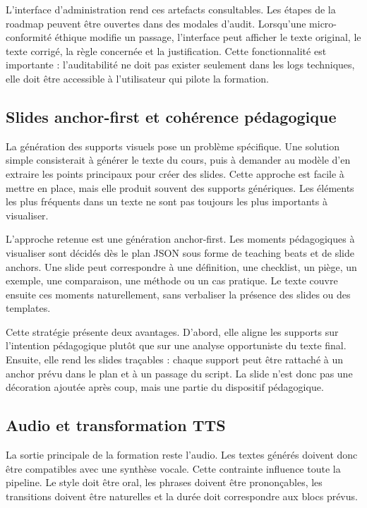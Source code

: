 L'interface d'administration rend ces artefacts consultables. Les étapes de la roadmap
peuvent être ouvertes dans des modales d'audit. Lorsqu'une micro-conformité éthique
modifie un passage, l'interface peut afficher le texte original, le texte corrigé, la règle
concernée et la justification. Cette fonctionnalité est importante : l'auditabilité ne doit
pas exister seulement dans les logs techniques, elle doit être accessible à l'utilisateur qui
pilote la formation.

\subsection{Slides anchor-first et cohérence pédagogique}

La génération des supports visuels pose un problème spécifique. Une solution simple
consisterait à générer le texte du cours, puis à demander au modèle d'en extraire les
points principaux pour créer des slides. Cette approche est facile à mettre en place, mais
elle produit souvent des supports génériques. Les éléments les plus fréquents dans un
texte ne sont pas toujours les plus importants à visualiser.

L'approche retenue est une génération anchor-first. Les moments pédagogiques à
visualiser sont décidés dès le plan JSON sous forme de teaching beats et de slide anchors.
Une slide peut correspondre à une définition, une checklist, un piège, un exemple, une
comparaison, une méthode ou un cas pratique. Le texte couvre ensuite ces moments
naturellement, sans verbaliser la présence des slides ou des templates.

Cette stratégie présente deux avantages. D'abord, elle aligne les supports sur l'intention
pédagogique plutôt que sur une analyse opportuniste du texte final. Ensuite, elle rend les
slides traçables : chaque support peut être rattaché à un anchor prévu dans le plan et à
un passage du script. La slide n'est donc pas une décoration ajoutée après coup, mais une
partie du dispositif pédagogique.

\subsection{Audio et transformation TTS}

La sortie principale de la formation reste l'audio. Les textes générés doivent donc être
compatibles avec une synthèse vocale. Cette contrainte influence toute la pipeline. Le
style doit être oral, les phrases doivent être prononçables, les transitions doivent être
naturelles et la durée doit correspondre aux blocs prévus.

